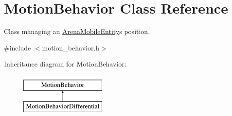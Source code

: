 \hypertarget{class_motion_behavior}{}\section{Motion\+Behavior Class Reference}
\label{class_motion_behavior}


Class managing an \hyperlink{class_arena_mobile_entity}{Arena\+Mobile\+Entity}\textquotesingle{}s position.  




{\ttfamily \#include $<$motion\+\_\+behavior.\+h$>$}

Inheritance diagram for Motion\+Behavior\+:\begin{figure}[H]
\begin{center}
\leavevmode
\includegraphics[height=2.000000cm]{class_motion_behavior}
\end{center}
\end{figure}
